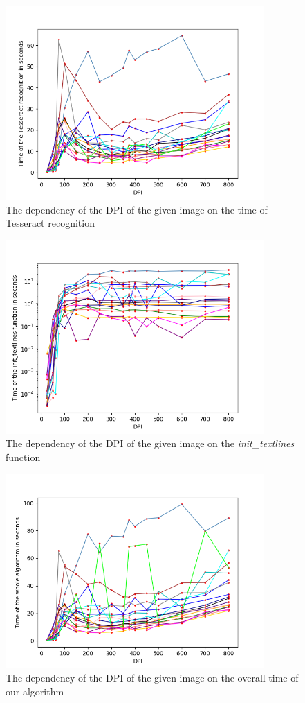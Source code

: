 \begin{figure}
\centering
\includegraphics[height=20em]{img/results/dpiTimeTesseract.png}
\caption{The dependency of the DPI of the given image on the time of Tesseract recognition}
\label{fig:dpiTessTime}
\end{figure}

\begin{figure}
\centering
\includegraphics[height=20em]{img/results/dpiTimeInit.png}
\caption{The dependency of the DPI of the given image on the \emph{init\_textlines} function}
\label{fig:dpiInitTime}
\end{figure}

\begin{figure}
\centering
\includegraphics[height=20em]{img/results/dpiTimeAll.png}
\caption{The dependency of the DPI of the given image on the overall time of our algorithm}
\label{fig:dpiAllTime}
\end{figure}

